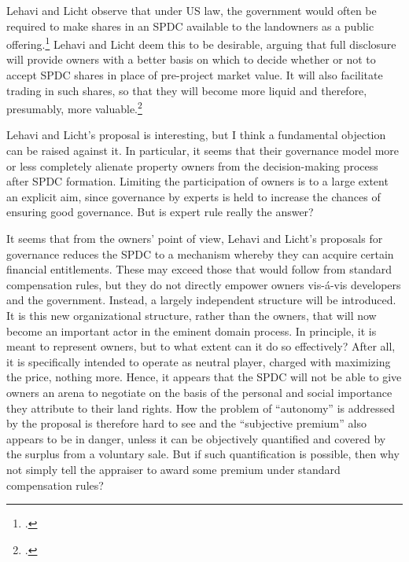 Lehavi and Licht observe that under US law, the government would often be required to make shares in an SPDC available to the landowners as a public offering.\footcite[1745]{lehavi07} Lehavi and Licht deem this to be desirable, arguing that full disclosure will provide owners with a better basis on which to decide whether or not to accept SPDC shares in place of pre-project market value. It will also facilitate trading in such shares, so that they will become more liquid and therefore, presumably, more valuable.\footcite[1746]{lehavi07} 

Lehavi and Licht's proposal is interesting, but I think a fundamental objection can be raised against it. In particular, it seems that their governance model more or less completely alienate property owners from the decision-making process after SPDC formation. Limiting the participation of owners is to a large extent an explicit aim, since governance by experts is held to increase the chances of ensuring good governance. But is expert rule really the answer?

It seems that from the owners' point of view, Lehavi and Licht's proposals for governance reduces the SPDC to a mechanism whereby they can acquire certain financial entitlements. These may exceed those that would follow from standard compensation rules, but they do not directly empower owners vis-{\'a}-vis developers and the government. Instead, a largely independent structure will be introduced. It is this new organizational structure, rather than the owners, that will now become an important actor in the eminent domain process. In principle, it is meant to represent owners, but to what extent can it do so effectively? After all, it is specifically intended to operate as neutral player, charged with maximizing the price, nothing more. Hence, it appears that the SPDC will not be able to give owners an arena to negotiate on the basis of the personal and social importance they attribute to their land rights. How the problem of ``autonomy'' is addressed by the proposal is therefore hard to see and the ``subjective premium'' also appears to be in danger, unless it can be objectively quantified and covered by the surplus from a voluntary sale. But if such quantification is possible, then why not simply tell the appraiser to award some premium under standard compensation rules?

